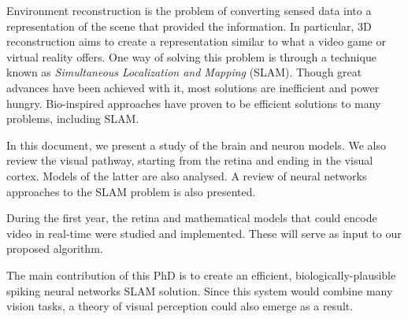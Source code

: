Environment reconstruction is the problem of converting sensed data into a representation of the scene that provided the information. In particular, 3D reconstruction aims to create a representation similar to what a video game or virtual reality offers. One way of solving this problem is through a technique known as \emph{Simultaneous Localization and Mapping} (SLAM). Though great advances have been achieved with it, most solutions are inefficient and power hungry. Bio-inspired approaches have proven to be efficient solutions to many problems, including SLAM. 

In this document, we present a study of the brain and neuron models. We also review the visual pathway, starting from the retina and ending in the visual cortex. Models of the latter are also analysed. A review of neural networks approaches to the SLAM problem is also presented.

During the first year, the retina and mathematical models that could encode video in real-time were studied and implemented. These will serve as input to our proposed algorithm.

The main contribution of this PhD is to create an efficient, biologically-plausible spiking neural networks SLAM solution. Since this system would combine many vision tasks, a theory of visual perception could also emerge as a result.
